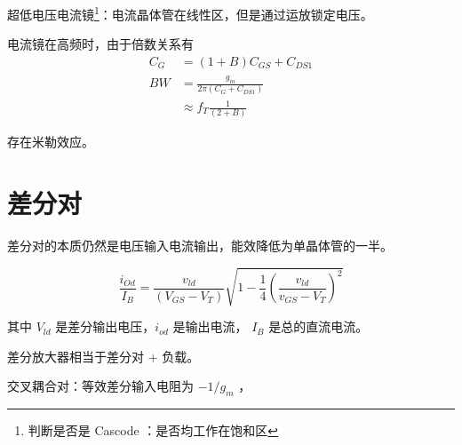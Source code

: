 \documentclass[cn,11pt,chinese,black,simple]{../elegantbook}
\begin{document}
超低电压电流镜\footnote{判断是否是 Cascode ：是否均工作在饱和区}：电流晶体管在线性区，但是通过运放锁定电压。

电流镜在高频时，由于倍数关系有
\begin{equation}\begin{aligned}
    C_{G} &=(1+B) C_{G S}+C_{D S 1} \\
    B W &=\frac{g_{m}}{2 \pi\left(C_{G}+C_{D S 1}\right)} \\
    & \approx f_{T} \frac{1}{(2+B)}
\end{aligned}\end{equation}

存在米勒效应。

\section{差分对}

差分对的本质仍然是电压输入电流输出，能效降低为单晶体管的一半。

\begin{equation}\frac{ i _{ O d }}{ I _{ B }}=\frac{ v _{ ld }}{\left( V _{ GS }- V _{ T }\right)}  \sqrt{1-\frac{1}{4}\left(\frac{ v _{ ld }}{ v _{ GS }- V _{ T }}\right)^{2}}\end{equation}

其中 \(V_{ld}\) 是差分输出电压，\(i_{od}\) 是输出电流， \(I_B\) 是总的直流电流。

差分放大器相当于差分对 + 负载。

交叉耦合对：等效差分输入电阻为 \(-1/g_m\) ，


\let\chapname\undefined
\ifx\mainclass\undefined
\end{document}
